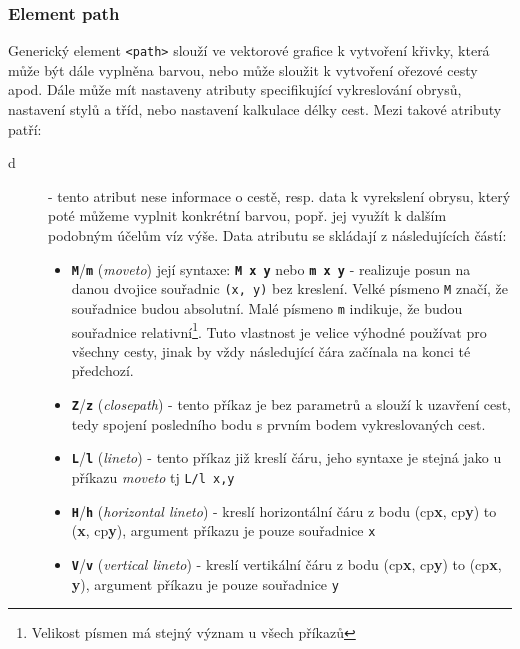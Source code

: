 \subsubsection{Element path}
Generický element \texttt{<path>} slouží ve vektorové grafice k vytvoření křivky, která může být dále vyplněna barvou, nebo může sloužit k vytvoření ořezové cesty apod. Dále může mít nastaveny atributy specifikující vykreslování obrysů, nastavení stylů a tříd, nebo nastavení kalkulace délky cest. Mezi takové atributy patří:

\begin{description}
	\item[d]  - tento atribut nese informace o cestě, resp. data k vyrekslení obrysu, který poté můžeme vyplnit konkrétní barvou, popř. jej využít k dalším podobným účelům víz výše. Data atributu se skládají z následujících částí:
	\begin{itemize}
		\item \texttt{\textbf{M}}/\texttt{\textbf{m}} (\textit{moveto}) její syntaxe: \texttt{\textbf{M x y}} nebo \texttt{\textbf{m x y}} - realizuje posun na danou dvojice souřadnic \texttt{(x, y)} bez kreslení. Velké písmeno \texttt{M} značí, že souřadnice budou absolutní. Malé písmeno \texttt{m} indikuje, že budou souřadnice relativní\footnote{Velikost písmen má stejný význam u všech příkazů}. Tuto vlastnost je velice výhodné používat pro všechny cesty, jinak by vždy následující čára začínala na konci té předchozí.\\
		
		\item \texttt{\textbf{Z}}/\texttt{\textbf{z}} (\textit{closepath}) - tento příkaz je bez parametrů a slouží k uzavření cest, tedy spojení posledního bodu s prvním bodem vykreslovaných cest.\\
		
		\item \texttt{\textbf{L}}/\texttt{\textbf{l}} (\textit{lineto}) - tento příkaz již kreslí čáru, jeho syntaxe je  stejná jako u příkazu \textit{moveto} tj \texttt{L/l x,y}\\
		
		\item \texttt{\textbf{H}}/\texttt{\textbf{h}} (\textit{horizontal lineto}) - kreslí horizontální čáru z bodu (cp\textbf{x}, cp\textbf{y}) to (\textbf{x}, cp\textbf{y}), argument příkazu je pouze souřadnice \texttt{x}\\
		
		\item \texttt{\textbf{V}}/\texttt{\textbf{v}} (\textit{vertical lineto}) - kreslí vertikální čáru z bodu (cp\textbf{x}, cp\textbf{y}) to (cp\textbf{x}, \textbf{y}), argument příkazu je pouze souřadnice \texttt{y}\\
		

\end{itemize}
\end{description}
